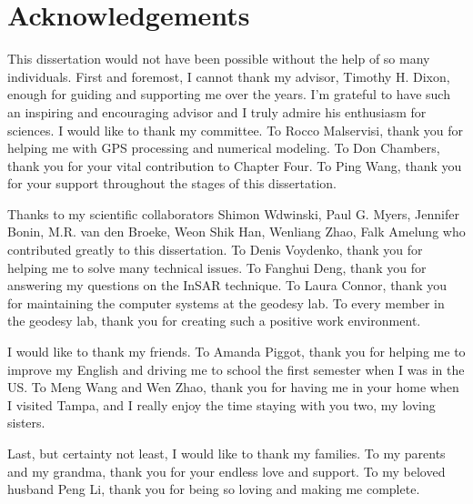 \chapter*{Acknowledgements}
\thispagestyle{empty}
\doublespacing
This dissertation would not have been possible without the help of so many individuals.  First and foremost, I cannot thank my advisor, Timothy H. Dixon, enough for guiding and supporting me over the years.  I’m grateful to have such an inspiring and encouraging advisor and I truly admire his enthusiasm for sciences. I would like to thank my committee.  To Rocco Malservisi, thank you for helping me with GPS processing and numerical modeling.  To Don Chambers, thank you for your vital contribution to Chapter Four.  To Ping Wang, thank you for your support throughout the stages of this dissertation.

Thanks to my scientific collaborators Shimon Wdwinski, Paul G. Myers, Jennifer Bonin, M.R. van den Broeke, Weon Shik Han, Wenliang Zhao, Falk Amelung who contributed greatly to this dissertation.  To Denis Voydenko, thank you for helping me to solve many technical issues.  To Fanghui Deng, thank you for answering my questions on the InSAR technique.  To Laura Connor, thank you for maintaining the computer systems at the geodesy lab.  To every member in the geodesy lab, thank you for creating such a positive work environment.

I would like to thank my friends.  To Amanda Piggot, thank you for helping me to improve my English and driving me to school the first semester when I was in the US.  To Meng Wang and Wen Zhao, thank you for having me in your home when I visited Tampa, and I really enjoy the time staying with you two, my loving sisters.  

Last, but certainty not least, I would like to thank my families. To my parents and my grandma, thank you for your endless love and support.   To my beloved husband Peng Li, thank you for being so loving and making me complete.  
